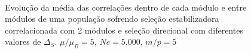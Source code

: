 \begin{figure}[htbp]
   \vspace{-18pt}
   \vspace{11pt}
   \\
   \caption{ Evolução da média das correlações dentro de cada módulo
      e entre módulos de uma população sofrendo seleção estabilizadora
      correlacionada com 2 módulos e seleção direcional com diferentes
   valores de $\Delta_S$. $\mu/\mu_B = 5$, $Ne = 5.000$, $m/p=5$}
   \label{AVGEntreIntra}
\end{figure}

